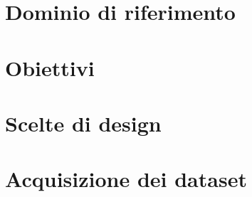 \section{Dominio di riferimento}


\section{Obiettivi}


\section{Scelte di design}

\section{Acquisizione dei dataset}



